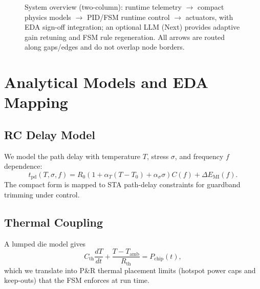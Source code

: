 \documentclass[conference]{IEEEtran}
\begin{document}
\begin{figure}[t]
\caption{System overview (two-column): runtime telemetry $\rightarrow$ compact physics models $\rightarrow$ PID/FSM runtime control $\rightarrow$ actuators, with EDA sign-off integration; an optional LLM (Next) provides adaptive gain retuning and FSM rule regeneration. All arrows are routed along gaps/edges and do not overlap node borders.}
\label{fig:system}
\end{figure}

\section{Analytical Models and EDA Mapping}
\subsection{RC Delay Model}
We model the path delay with temperature $T$, stress $\sigma$, and frequency $f$ dependence:
\begin{equation}
t_{\mathrm{pd}}(T,\sigma,f)=R_0\!\left(1+\alpha_T(T-T_0)+\alpha_\sigma\sigma\right)C(f)+\Delta E_{\mathrm{MI}}(f).
\end{equation}
The compact form is mapped to STA path-delay constraints for guardband trimming under control.

\subsection{Thermal Coupling}
A lumped die model gives
\begin{equation}
C_{\mathrm{th}}\frac{dT}{dt}+\frac{T-T_{\mathrm{amb}}}{R_{\mathrm{th}}}=P_{\mathrm{chip}}(t),
\end{equation}
which we translate into P\&R thermal placement limits (hotspot power caps and keep-outs) that the FSM enforces at run time.
\end{document}
